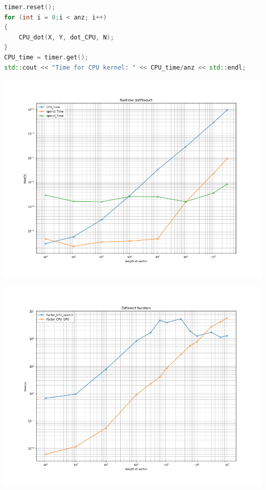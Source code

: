 \documentclass[11pt,a4paper]{article}
\begin{document}
\begin{lstlisting}[language=C++, caption={CPU benchmark}]
timer.reset();
for (int i = 0;i < anz; i++)
{
	CPU_dot(X, Y, dot_CPU, N);
}
CPU_time = timer.get();
std::cout << "Time for CPU kernel: " << CPU_time/anz << std::endl;
\end{lstlisting}
\begin{center}
\begin{minipage}[t]{0.49\textwidth}
	\includegraphics[width=\textwidth]{Bilder/Runtime_dotProduct}
\end{minipage}
\begin{minipage}[t]{0.49\textwidth}
	\includegraphics[width=\textwidth]{Bilder/diff_factor}
\end{minipage}	
\end{center}
\end{document}
